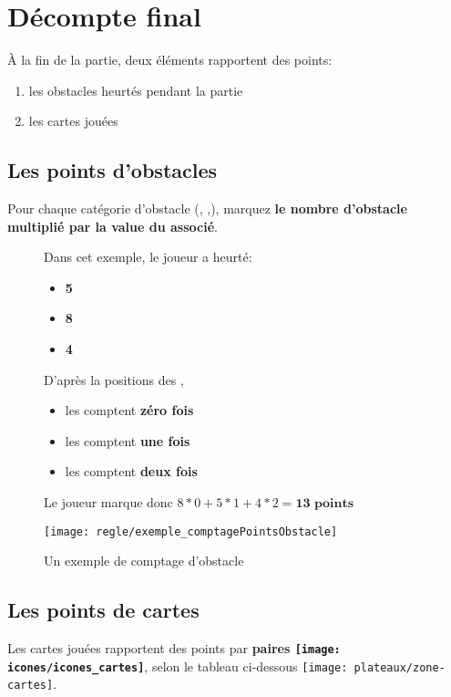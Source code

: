 \section*{Décompte final} \label{sec:comptagePoints}
À la fin de la partie, deux éléments rapportent des points:
\begin{enumerate}
\item les obstacles heurtés pendant la partie
\item les cartes jouées
\end{enumerate}

\subsection*{Les points d'obstacles} \label{sec:pointsObstacles}
Pour chaque catégorie d'obstacle (\arbre, \tronc,\rocher), marquez \textbf{le nombre d'obstacle multiplié par la value du \marqueurObstacle associé}.

\begin{figure}[h]
\begin{tcolorbox}[colback=white,colframe=OliveGreen!75!black,title=Exemple]
{    \begin{multicols}{2}
    Dans cet exemple, le joueur \eau a heurté:
	\begin{itemize}
	\item \textbf{5 \arbre}
	\item \textbf{8 \tronc}
	\item \textbf{4 \rocher}
	\end{itemize}
	D'après la positions des \marqueursObstacles,
	\begin{itemize}
	\item les \tronc comptent \textbf{zéro fois}
	\item les \arbre comptent \textbf{une fois}
	\item les \rocher comptent \textbf{deux fois}
	\end{itemize}
	Le joueur \eau marque donc $8*0+5*1+4*2 = \textbf{13 points}$
    
    \columnbreak
	\texttt{[image: regle/exemple\_comptagePointsObstacle]}
    \caption{Un exemple de comptage d'obstacle}
    \end{multicols}
}
\end{tcolorbox}
\end{figure}
\FloatBarrier


\subsection*{Les points de cartes} \label{sec:pointsCarte}
Les cartes jouées rapportent des points par \textbf{paires \texttt{[image: icones/icones\_cartes]}}, selon le tableau ci-dessous
\texttt{[image: plateaux/zone-cartes]}.

